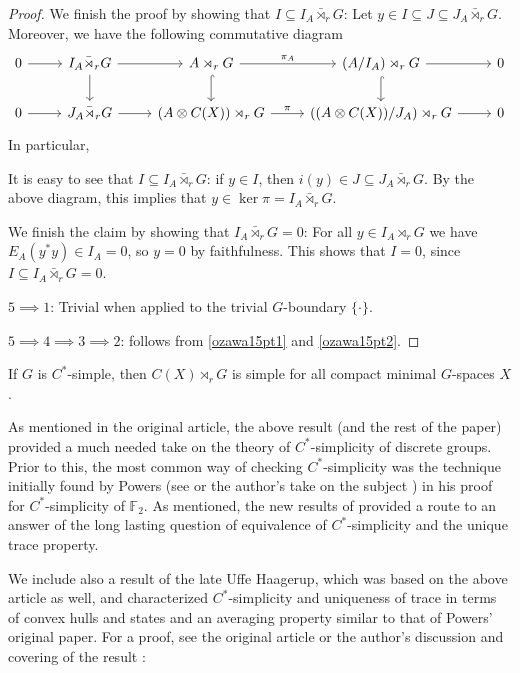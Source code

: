 \begin{proof}
	We finish the proof by showing that $I \subseteq I_A \bar \rtimes_r G$: Let $y \in I \subseteq J \subseteq J_A \bar \rtimes_r G$. Moreover, we have the following commutative diagram
	\begin{equation*}
		\begin{tikzcd}
			0 \ar[r] &  I_A \bar \rtimes_r G \ar[d] \ar[r] & A \rtimes_r G \ar[r, "\pi_A"] \ar[d, hook] & (A / I_A)\rtimes_r G  \ar[r] \ar[d, hook]  & 0\\
			0  \ar[r] & J_A \bar \rtimes_r G  \ar[r] & (A \otimes C(X)) \rtimes_r G \ar[r, "\pi"] & \left((A \otimes C(X))/J_A\right) \rtimes_r G \ar[r] & 0
		\end{tikzcd}
	\end{equation*}
	In particular,

	It is easy to see that $I \subseteq I_A \bar \rtimes_r G$: if $y \in I$, then $i(y) \in J \subseteq J_A \bar \rtimes_r G$. By the above diagram, this implies that $y \in \ker \pi = I_A \bar \rtimes_r G$. 
	
	We finish the claim by showing that $I_A \bar \rtimes_r G = 0$: For all $y \in I_A \rtimes_r G$ we have $E_A(y^*y) \in I_A = 0$, so $y = 0$ by faithfulness. This shows that $I = 0$, since $I \subseteq I_A \bar \rtimes_r G = 0$.

	$5 \implies 1$: Trivial when applied to the trivial $G$-boundary $\{\cdot\}$.

	$5 \implies 4 \implies 3 \implies 2$: follows from \cref{ozawa15pt1} and \cref{ozawa15pt2}.
\end{proof}
\begin{corollary}
	If $G$ is $C^*$-simple, then $C(X) \rtimes_{r}G$ is simple for all compact minimal $G$-spaces $X$.
\end{corollary}
\begin{note}
	As mentioned in the original article, the above result (and the rest of the paper) provided a much needed take on the theory of $C^*$-simplicity of discrete groups. Prior to this, the most common way of checking $C^*$-simplicity was the technique initially found by Powers (see \cite{powers1975simplicity} or the author's take on the subject \cite[chapter 3]{bscp}) in his proof for $C^*$-simplicity of $\mathbb{F}_2$. As mentioned, the new results of \cite{breuillard2017c} provided a route to an answer of the long lasting question of equivalence of $C^*$-simplicity and the unique trace property.
\end{note}
We include also a result of the late Uffe Haagerup, which was based on the above article as well, and characterized $C^*$-simplicity and uniqueness of trace in terms of convex hulls and states and an averaging property similar to that of Powers' original paper. For a proof, see the original article \cite{haagerup2015new} or the author's discussion and covering of the result \cite[Chapter 5]{bscp}:
